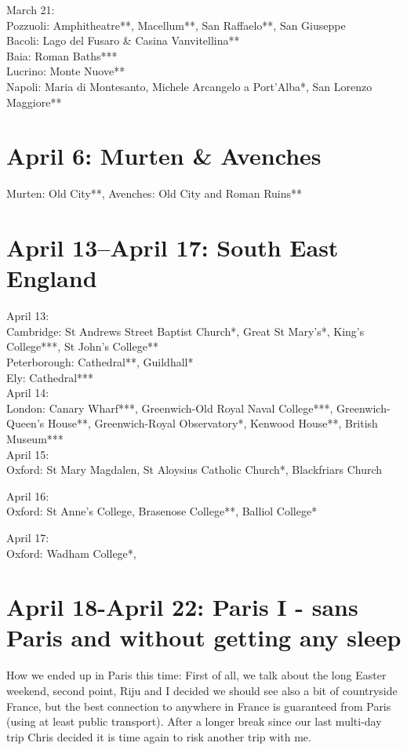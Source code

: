 March 21:\\
Pozzuoli: Amphitheatre**, Macellum**, San Raffaelo**, San Giuseppe\\
Bacoli: Lago del Fusaro \& Casina Vanvitellina**\\
Baia: Roman Baths***\\
Lucrino: Monte Nuove**\\
Napoli: Maria di Montesanto, Michele Arcangelo a Port'Alba*, San Lorenzo Maggiore**


\section{April 6: Murten \& Avenches}
\label{Birthday2019}

Murten: Old City**, Avenches: Old City and Roman Ruins**

\section{April 13--April 17: South East England}
\label{2019SouthEastEngland}

April 13:\\
Cambridge: St Andrews Street Baptist Church*, Great St Mary's*, King's College***, St John's College**\\
Peterborough: Cathedral**, Guildhall*\\
Ely: Cathedral***\\

April 14:\\
London: Canary Wharf***, Greenwich-Old Royal Naval College***, Greenwich-Queen's House**, Greenwich-Royal Observatory*, Kenwood House**, British Museum***\\

April 15: \\
Oxford: St Mary Magdalen, St Aloysius Catholic Church*, Blackfriars Church

April 16:\\
Oxford: St Anne's College, Brasenose College**, Balliol College*

April 17:\\
Oxford: Wadham College*, 

\section{April 18-April 22: Paris I - sans Paris and without getting any sleep}
\label{2019:Paris I}

How we ended up in Paris this time: First of all, we talk about the long Easter weekend, second point, Riju and I decided we should see also a bit of countryside France, but the best connection to anywhere in France is guaranteed from Paris (using at least public transport). After a longer break since our last multi-day trip Chris decided it is time again to risk another trip with me.\\

